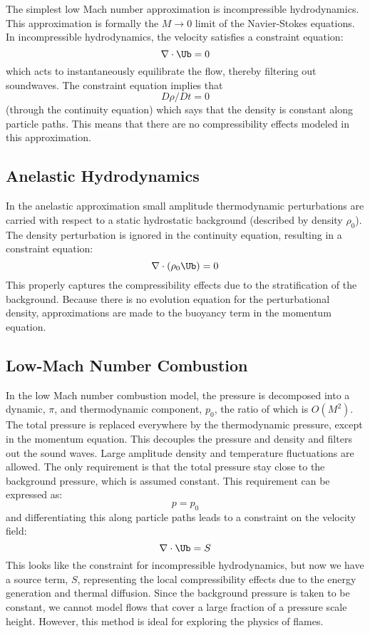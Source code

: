 The simplest low Mach number approximation is incompressible
hydrodynamics. This approximation is formally the $M \rightarrow 0$
limit of the Navier-Stokes equations. In incompressible hydrodynamics,
the velocity satisfies a constraint equation:
\begin{equation}
\nabla \cdot \Ub = 0
\end{equation}
which acts to instantaneously equilibrate the flow, thereby filtering
out soundwaves.  The constraint equation implies that
\begin{equation}
D\rho/Dt = 0
\end{equation}
(through the continuity equation) which says that the density is
constant along particle paths. This means that there are no
compressibility effects modeled in this approximation.


\subsection{Anelastic Hydrodynamics}

In the anelastic approximation small amplitude thermodynamic
perturbations are carried with respect to a static hydrostatic
background (described by density $\rho_0$).  The density perturbation
is ignored in the continuity equation, resulting in a constraint
equation:
\begin{equation}
\nabla \cdot (\rho_0 \Ub) = 0
\end{equation}
This properly captures the compressibility effects due to the
stratification of the background. Because there is no evolution
equation for the perturbational density, approximations are made to
the buoyancy term in the momentum equation.

\subsection{Low-Mach Number Combustion}

In the low Mach number combustion model, the pressure is decomposed
into a dynamic, $\pi$, and thermodynamic component, $p_0$, the ratio
of which is $O(M^2)$. The total pressure is replaced everywhere by the
thermodynamic pressure, except in the momentum equation. This
decouples the pressure and density and filters out the sound
waves. Large amplitude density and temperature fluctuations are
allowed. The only requirement is that the total pressure stay close to
the background pressure, which is assumed constant. This requirement
can be expressed as:
\begin{equation}
p = p_0
\end{equation}
and differentiating this along particle paths leads to a constraint on
the velocity field: 
\begin{equation}
\nabla \cdot \Ub = S 
\end{equation}
This looks like the constraint for incompressible hydrodynamics, but
now we have a source term, $S$, representing the local compressibility
effects due to the energy generation and thermal diffusion.  Since the
background pressure is taken to be constant, we cannot model flows
that cover a large fraction of a pressure scale height. However, this
method is ideal for exploring the physics of flames.

